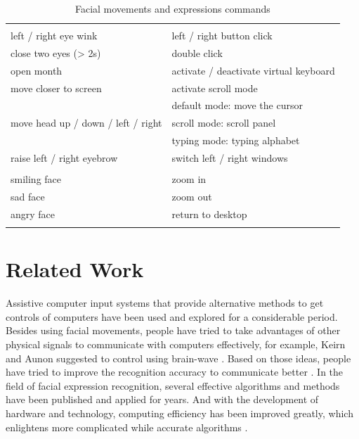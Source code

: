 \documentclass{sigchi}
\begin{document}
\begin{table}[t]
    \centering
    \begin{tabular}{ | p{} | p{} |}
    \hhline{==}
    \multicolumn{2}{|l|}{Movement} \\ \hhline{==}
    left / right eye wink & left / right button click \\ \hline
    close two eyes (> 2s) & double click \\ \hline
    open month & activate / deactivate virtual keyboard \\ \hline
    move closer to screen & activate scroll mode \\ \hline
    \multirow{3}{\hsize}{move head up / down / left / right} 
    & default mode: move the cursor\\ \cline{2-2}
    & scroll mode: scroll panel \\ \cline{2-2}
    & typing mode: typing alphabet \\ \hline
    raise left / right eyebrow & switch left / right windows \\ \hhline{==}
    \multicolumn{2}{|l|}{Expression} \\ \hhline{==}
    smiling face & zoom in \\ \hline
    sad face & zoom out \\ \hline
    angry face & return to desktop\\ \hhline{==}
    \end{tabular}
    \caption{Facial movements and expressions commands}
    \label{tab:table1}
\end{table}

\section{Related Work}
Assistive computer input systems that provide alternative methods to get controls of computers have been used and explored for a considerable period.
Besides using facial movements, people have tried to take advantages of other physical signals to communicate with computers effectively, for example, Keirn and Aunon suggested to control using brain-wave \cite{keirn1990man}.
Based on those ideas, people have tried to improve the recognition accuracy to communicate better \cite{pantic2000automatic} \cite{saragih2011deformable}.
In the field of facial expression recognition, several effective algorithms and methods have been published and applied for years.
And with the development of hardware and technology, computing efficiency has been improved greatly, which enlightens more complicated while accurate algorithms \cite{matsumoto2000algorithm} \cite{betke2002camera} \cite{morris2006facial} \cite{varona2008hands}.
\end{document}
